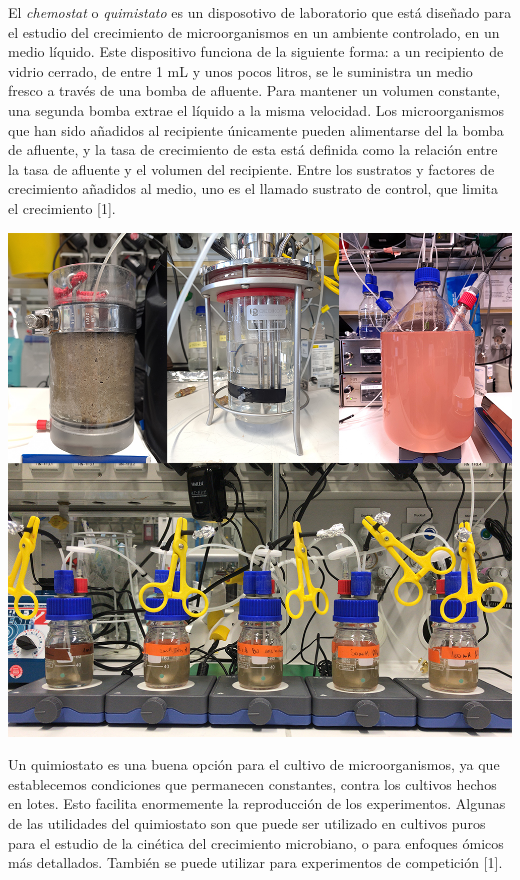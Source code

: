 \documentclass[letterpaper]{article}
\begin{document}
{{            \normalsize{El \textit{chemostat} o \textit{quimistato} es un disposotivo de laboratorio que está diseñado para el estudio del crecimiento de microorganismos en un ambiente controlado, en un medio líquido. Este dispositivo funciona de la siguiente forma: a un recipiento de vidrio cerrado, de entre 1 mL y unos pocos litros, se le suministra un medio fresco a través de una bomba de afluente. Para mantener un volumen constante, una segunda bomba extrae el líquido a la misma velocidad. Los microorganismos que han sido añadidos al recipiente únicamente pueden alimentarse del la bomba de afluente, y la tasa de crecimiento de esta está definida como la relación entre la tasa de afluente y el volumen del recipiente. Entre los sustratos y factores de crecimiento añadidos al medio, uno es el llamado sustrato de control, que limita el crecimiento [1].}

            \begin{center}
                \includegraphics[scale=0.2]{Chemostat.jpg}
            \end{center}

            \normalsize{Un quimiostato es una buena opción para el cultivo de microorganismos, ya que establecemos condiciones que permanecen constantes, contra los cultivos hechos en lotes. Esto facilita enormemente la reproducción de los experimentos. Algunas de las utilidades del quimiostato son que puede ser utilizado en cultivos puros para el estudio de la cinética del crecimiento microbiano, o para enfoques ómicos más detallados. También se puede utilizar para experimentos de competición [1].}\\
            
}}
\end{document}
